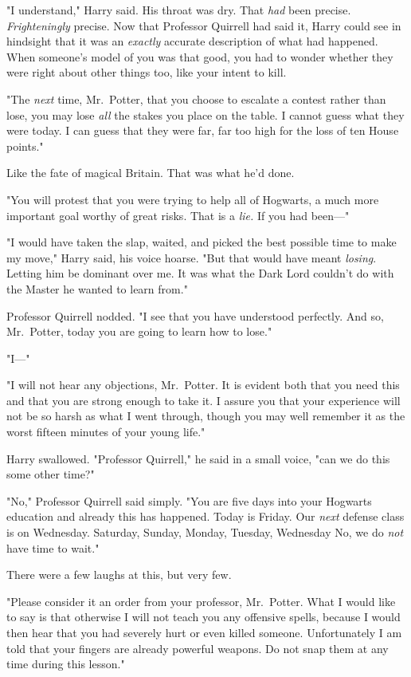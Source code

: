 "I understand," Harry said. His throat was dry. That \emph{had} been precise.
\emph{Frighteningly} precise. Now that Professor Quirrell had said it, Harry
could see in hindsight that it was an \emph{exactly} accurate description of
what had happened. When someone's model of you was that good, you had to wonder
whether they were right about other things too, like your intent to kill.

"The \emph{next} time, Mr.~Potter, that you choose to escalate a contest rather
than lose, you may lose \emph{all} the stakes you place on the table. I cannot
guess what they were today. I can guess that they were far, far too high for
the loss of ten House points."

Like the fate of magical Britain. That was what he'd done.

"You will protest that you were trying to help all of Hogwarts, a much more
important goal worthy of great risks. That is a \emph{lie.} If you had been\mbox{---}"

"I would have taken the slap, waited, and picked the best possible time to make
my move," Harry said, his voice hoarse. "But that would have meant
\emph{losing}. Letting him be dominant over me. It was what the Dark Lord
couldn't do with the Master he wanted to learn from."

Professor Quirrell nodded. "I see that you have understood perfectly. And so,
Mr.~Potter, today you are going to learn how to lose."

"I\mbox{---}"

"I will not hear any objections, Mr.~Potter. It is evident both that you need
this and that you are strong enough to take it. I assure you that your
experience will not be so harsh as what I went through, though you may well
remember it as the worst fifteen minutes of your young life."

Harry swallowed. "Professor Quirrell," he said in a small voice, "can we do
this some other time?"

"No," Professor Quirrell said simply. "You are five days into your Hogwarts
education and already this has happened. Today is Friday. Our \emph{next}
defense class is on Wednesday. Saturday, Sunday, Monday, Tuesday,
Wednesday{\el} No, we do \emph{not} have time to wait."

There were a few laughs at this, but very few.

"Please consider it an order from your professor, Mr.~Potter. What I would like
to say is that otherwise I will not teach you any offensive spells, because I
would then hear that you had severely hurt or even killed someone.
Unfortunately I am told that your fingers are already powerful weapons. Do not
snap them at any time during this lesson."

